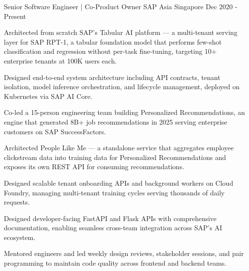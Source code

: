 

\begin{cventries}

  \cventry
    {Senior Software Engineer | Co-Product Owner} %
    {SAP Asia} %
    {Singapore} %
    {Dec 2020 - Present} %
    {
      \begin{cvitems} %
        \item {Architected from scratch SAP's Tabular AI platform — a multi-tenant serving layer for SAP RPT-1, a tabular foundation model that performs few-shot classification and regression without per-task fine-tuning, targeting 10+ enterprise tenants at 100K users each.}
        \item {Designed end-to-end system architecture including API contracts, tenant isolation, model inference orchestration, and lifecycle management, deployed on Kubernetes via SAP AI Core.}
        \item {Co-led a 15-person engineering team building Personalized Recommendations, an engine that generated 8B+ job recommendations in 2025 serving enterprise customers on SAP SuccessFactors.}
        \item {Architected People Like Me — a standalone service that aggregates employee clickstream data into training data for Personalized Recommendations and exposes its own REST API for consuming recommendations.}
        \item {Designed scalable tenant onboarding APIs and background workers on Cloud Foundry, managing multi-tenant training cycles serving thousands of daily requests.}
        \item {Designed developer-facing FastAPI and Flask APIs with comprehensive documentation, enabling seamless cross-team integration across SAP's AI ecosystem.}
        \item {Mentored engineers and led weekly design reviews, stakeholder sessions, and pair programming to maintain code quality across frontend and backend teams.}
      \end{cvitems}
    }


\end{cventries}
